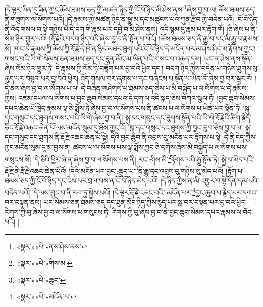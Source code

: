 །དེ་ལྟར་ཡིན་དུ་ཟིན་ཀྱང་ཆོས་ཐམས་ཅད་ཀྱི་མཚན་ཉིད་ཀྱི་ངོ་བོ་ཉིད་མི་ཤེས་ནས་\footnote{«སྣར་»«པེ་»ནས་ཤེས་ནས་}ཞེས་བྱ་བ་ལ། ཆོས་ཐམས་ཅད་ནི་གཟུགས་ལ་སོགས་པའོ། །དེ་རྣམས་ཀྱི་མཚན་ཉིད་ནི་སྒྱུ་མ་དང་མཚུངས་པའི་ཀུན་རྫོབ་ཀྱི་བདེན་པའོ། །ངོ་བོ་ཉིད་ནི་འོད་གསལ་བ་སྟེ་གཉིས་པོ་དེ་དག་གི་རྣམ་པར་དབྱེ་བ་མི་ཤེས་ནས། འདི་སྙམ་དུ་རྣམ་པར་རྟོག་གོ། །ཅི་ཞེས་པ་ནི་སོམ་ཉིར་གྱུར་པའོ། །རྡོ་རྗེའི་བདག་ཉིད་འདི་ཞེས་བྱ་བ་ནི་སྟོན་པ་པོའོ། །ཆོས་ཐམས་ཅད་ནི་རྒྱུ་བ་དང་མི་རྒྱུ་བ་རྣམས་སོ། །གང་དེ་རྣམས་ཀྱི་ཆོས་ཀྱི་རྡོ་རྗེ་དེ་ཁོ་ན་ཉིད་མཐར་ཐུག་པའི་ངོ་བོ་ཉིད་དེ་མངོན་པར་མ་ཤེས་ཤིང་མ་རྟོགས་ཀྱང་། གསང་བའི་ཡི་གེ་སེམས་ཅན་ཐམས་ཅད་དང་ཐུན་མོང་མ་ཡིན་པའི་གསང་བ་འཆད་དམ། ཡང་ན་ཤེས་ནས་སྟོན་ཞེས་སོམ་ཉིར་གྱུར་ཏེ། དེ་རྣམས་ཀྱི་སོམ་ཉི་བཟློག་པར་བྱ་བའི་ཕྱིར་དང་། བདག་ཉིད་ཀྱིས་བདེན་པ་གཉིས་ཐུགས་སུ་ཆུད་པར་བསྟན་པར་བྱ་བའི་ཕྱིར། འོད་གསལ་བར་ཞུགས་པ་དང་བཞེངས་པ་སྟོན་པ་ཡིན་ནོ་ཞེས་བྱ་བར་སྦྱར་རོ། །དེ་ནས་ཞེས་བྱ་བ་ལ་སོགས་པ་ལ། དེ་བཞིན་གཤེགས་པ་ཐམས་ཅད་ཅེས་པ་མི་བསྐྱོད་པ་ལ་སོགས་པ་དེ་རྣམས་ཀྱིས། འཇམ་དཔལ་ལ་སོགས་པ་བྱང་ཆུབ་སེམས་དཔའ་དེ་དག་ལ་འདི་སྐད་ཅེས་བཀའ་སྩལ་ཏོ། །བྱང་ཆུབ་སེམས་དཔའ་ཆེན་པོ་ཁྱེད་རྣམས་ལྟ་ཅི་སྨོས་ཏེ་ཞེས་བྱ་བ་ལ་སོགས་པས་ནི་ཚངས་པ་ལ་སོགས་པ་ཡིན་པར་སྟོན་ཏོ། །སྐུ་དང་གསུང་དང་ཐུགས་གསང་བའི་ཡི་གེ་ཞེས་བྱ་བ་ནི། སྐུ་དང་གསུང་དང་ཐུགས་སྟོན་པའི་ཡི་གེ་རྡོ་རྗེའི་ཚིག་རྙེད་ཅིང་རྡོ་རྗེ་འཆང་ཆེན་པོ་ལས་མངོན་སུམ་དུ་ཐོས་ཀྱང་ངོ། །སྐུ་དང་གསུང་དང་ཐུགས་ཀྱི་བྱང་ཆུབ་ཅེས་བྱ་བ་ལ། སྐུ་དང་གསུང་དང་ཐུགས་ནི་རྡོ་རྗེ་འཆང་ཆེན་པོ་སྟེ། དེའི་བྱང་ཆུབ་ནི་འབྲས་བུ་མངོན་པར་རྟོགས་པ་སྟེ། དེ་ནི་ངེད་ཀྱིས་ཀྱང་མངོན་སུམ་དུ་མ་བྱས་ན། ཚངས་པ་ལ་སོགས་པས་ལྟ་སྨོས་ཀྱང་ཅི་དགོས་ཞེས་མི་བསྐྱོད་པ་ལ་སོགས་པས་གསུངས་སོ། །དེ་ཅིའི་ཕྱིར་ཞེ་ན་ཞེས་བྱ་བ་ལ་སོགས་པས་ནི། རང་:གིས་མི་\footnote{«སྣར་»«པེ་»གིས་མ་}རྟོགས་པའི་རྒྱུ་སྟོན་ཏེ། སྐྱེ་བ་མེད་པའི་རྡོ་རྗེ་ནི་རྡོ་རྗེ་འཆང་ཆེན་པོའོ། །དེའི་མངོན་པར་བྱང་:ཆུབ་པ་\footnote{«སྣར་»«པེ་»ཆུབ་}ནི་རྒྱུ་དང་འབྲས་བུ་གཉིས་སུ་མེད་པའོ། །རྟོག་པ་ཐམས་ཅད་ཀྱི་ངོ་བོ་ཉིད་དང་ངེས་པར་བྲལ་བས་ན་ངོ་བོ་ཉིད་མེད་པའོ། །དེ་ཉིད་ཀྱིས་ན་མི་འགྱུར་བ་སྟེ་དོན་དམ་པའི་བདེན་པའོ། །དེ་ལས་བྱུང་བ་ནི་རབ་ཏུ་སྐྱེས་པའོ། །དེ་ལྟར་རྡོ་རྗེ་འཆང་བའི་:མངོན་པར་\footnote{«སྣར་»«པེ་»མངོན་པ་}བྱང་ཆུབ་པ་རྙེད་པར་དཀའ་བར་བསྟན་ནས། ཡང་སེམས་ཅན་ཐམས་ཅད་དང་ཐུན་མོང་ཉིད་ཀྱིས་རྙེད་པར་སླ་བར་བསྟན་པར་བྱ་བའི་ཕྱིར། རིགས་ཀྱི་བུ་ཞེས་བྱ་བ་ལ་སོགས་པ་གསུངས་ཏེ། རིགས་ཀྱི་བུ་ཞེས་བྱ་བ་ནི་བྱང་ཆུབ་སེམས་དཔའ་རྣམས་ལ་བོད་པའོ། །

